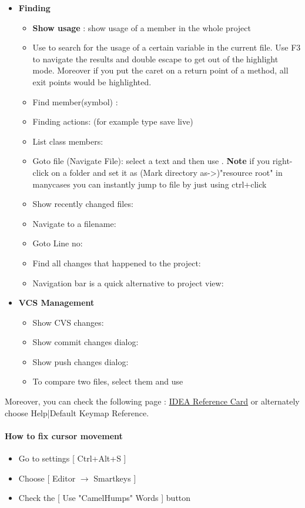 \begin{itemize}
	\item \textbf{Finding}
	\begin{itemize}
		\item \textbf{Show usage }: show usage of a member in the whole project
		\item Use  to search for the usage of a certain variable in the current file. Use F3 to navigate the results and double escape to get out of the highlight mode. Moreover if you put the caret on a return point of a method, all exit points would be highlighted.
		\item Find member(symbol) : 
		\item Finding actions:  (for example type save live)
		\item List class members: 
		\item Goto file (Navigate File): select a text and then use . \textbf{Note} if you right-click on a folder and set it as (Mark directory as->)"resource root" in manycases you can instantly jump to file by just using ctrl+click
		\item Show recently changed files: 
		\item Navigate to a filename: 
		\item Goto Line no: 
		\item Find all changes that happened to the project: 
		\item Navigation bar is a quick alternative to project view: 
	\end{itemize}
	\item \textbf{VCS Management}
	\begin{itemize}
		\item Show CVS changes: 
		\item Show commit changes dialog: 
		\item Show push changes dialog: 
		\item To compare two files, select them and use 
	\end{itemize}
\end{itemize}
Moreover, you can check the following page : \href{https://www.jetbrains.com/idea/docs/IntelliJIDEA_ReferenceCard.pdf}{IDEA Reference Card} or alternately choose Help|Default Keymap Reference.

\paragraph{How to fix cursor movement}
	\begin{itemize}
		\item Go to settings [ Ctrl+Alt+S ]
		\item Choose [ Editor $\rightarrow$ Smartkeys ]
		\item Check the [ Use "CamelHumps" Words ] button
	\end{itemize}


